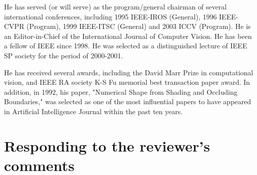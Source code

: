 \documentclass{mva2011}
\begin{document}
He has served (or will serve) as the program/general chairman of several  international conferences, including 1995 IEEE-IROS (General), 1996  IEEE-CVPR (Program), 1999 IEEE-ITSC (General) and 2003 ICCV (Program). He is an Editor-in-Chief of the International Journal of Computer Vision. He has been a fellow of IEEE since 1998. He was selected as a distinguished lecture of IEEE SP society for the period of 2000-2001.

He has received several awards, including the David Marr Prize in computational vision, and IEEE RA society K-S Fu memorial best transaction paper award. In addition, in 1992, his paper, "Numerical Shape from Shading and Occluding Boundaries," was selected as one of the most influential papers to have appeared in Artificial Intelligence Journal within the past ten years.
\newpage
\section*{Responding to the reviewer's comments }
\end{document}
